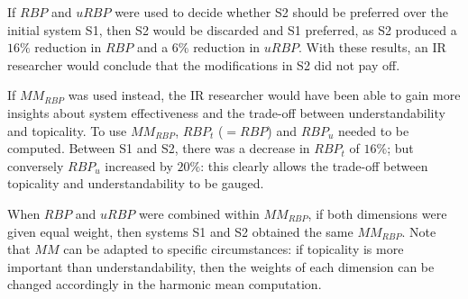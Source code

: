 If $RBP$ and $uRBP$ were used to decide whether S2 should be preferred over the initial system S1, then S2 would be discarded and S1 preferred, as S2 produced a $16\%$ reduction in $RBP$ and a $6\%$ reduction in $uRBP$. With these results, an IR researcher would conclude that the modifications in S2 did not pay off.

If $MM_{RBP}$ was used instead, the IR researcher would have been able to gain more insights about system effectiveness and the trade-off between understandability and topicality. To use $MM_{RBP}$, $RBP_t$ ($=RBP$) and $RBP_u$ needed to be computed. Between S1 and S2, there was a decrease in $RBP_t$ of $16\%$; but conversely $RBP_u$ increased by $20\%$: this clearly allows the trade-off between topicality and understandability to be gauged. 

When $RBP$ and $uRBP$ were combined within $MM_{RBP}$, if both dimensions were given equal weight, then systems S1 and S2 obtained the same $MM_{RBP}$. Note that $MM$ can be adapted to specific circumstances: if topicality is more important than understandability, then the weights of each dimension can be changed accordingly in the harmonic mean computation. 


